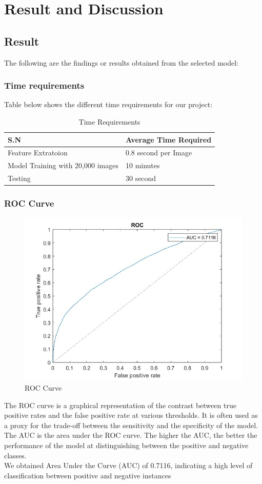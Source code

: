 \chapter{Result and Discussion}
\section{Result}
The following are the findings or results obtained from the selected model:
\subsection{Time requirements}
Table below shows the different time requirements for our project:
\begin{table}[H]
    \begin{tabular}{|l|l|}
    \hline
    S.N                & Average Time Required \\ \hline
    Feature Extratoion & 0.8 second per Image            \\ \hline
    Model Training with 20,000 images  & 10 minutes            \\ \hline
    Testing            & 30 second             \\ \hline
    \end{tabular}
    \caption{Time Requirements}
    \end{table}
\subsection{ROC Curve}
\begin{figure}[H]
    \centering
    \includegraphics[width=120mm]{./img/2600/roc2600.jpg}
    \caption{ROC Curve}
\end{figure}
The ROC curve is a graphical representation of the contrast between true positive rates and the false positive rate at various thresholds. It is often used as a proxy for the trade-off between the sensitivity and the specificity of the model. The AUC is the area under the ROC curve. The higher the AUC, the better the performance of the model at distinguishing between the positive and negative classes.\\
We obtained Area Under the Curve (AUC) of 0.7116, indicating a high level of classification between positive and negative instances
